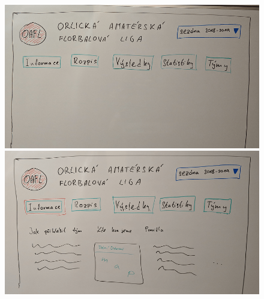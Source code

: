 \documentclass[11pt, a4paper, titlepage]{article}
\begin{document}
\begin{figure}[H]
\centering
    \begin{minipage}{.5\textwidth}
        \centering
        \includegraphics[width=.98\textwidth]{images/draft-01.png}
    \end{minipage}%
    \begin{minipage}{.5\textwidth}
        \centering
        \includegraphics[width=.98\textwidth]{images/draft-02.png}
    \end{minipage}
\end{figure}
\end{document}
